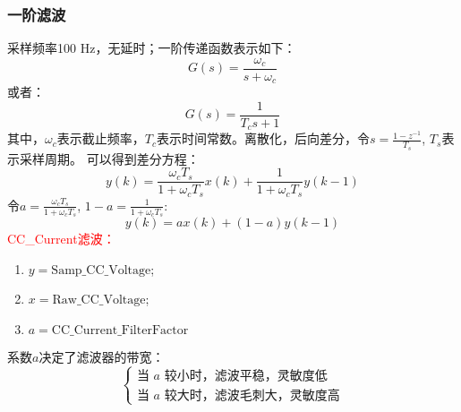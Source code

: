     \subsubsection*{一阶滤波}
        采样频率100 Hz，无延时；一阶传递函数表示如下：
            \begin{equation}
                G(s) = \frac{\omega_c}{s+\omega_c}
                \label{eq:CC2}
            \end{equation}
        或者：
            \begin{equation}
                G(s) = \frac{1}{T_cs+1}
                \label{eq:CC3}
            \end{equation}
        其中，$\omega_c$表示截止频率，$T_c$表示时间常数。离散化，后向差分，令$s = \frac{1-z^{-1}}{T_s}$, $T_s$表示采样周期。
        可以得到差分方程：
            \begin{equation}
                y(k) = \frac{\omega_cT_s}{1+\omega_cT_s}x(k)+\frac{1}{1+\omega_cT_s}y(k-1)
            \end{equation}
        令$a = \frac{\omega_cT_s}{1+\omega_cT_s}$, $1-a = \frac{1}{1+\omega_cT_s} $:
            \begin{equation}
                y(k) = ax(k)+(1-a)y(k-1)
                \label{eq:CC4}
            \end{equation}
        \textcolor{red}{CC\_Current滤波：}
            \begin{enumerate}[label={}]
                \item $y = \mathrm{Samp\_CC\_Voltage} $;
                \item $x = \mathrm{Raw\_CC\_Voltage} $;
                \item $a = \mathrm{CC\_Current\_FilterFactor}$
            \end{enumerate}
        系数$a$决定了滤波器的带宽：
            \begin{equation}
                \begin{cases}
                    \text{当 $a$ 较小时，滤波平稳，灵敏度低}\\
                    \text{当 $a$ 较大时，滤波毛刺大，灵敏度高}
                \end{cases}
            \end{equation}

          
